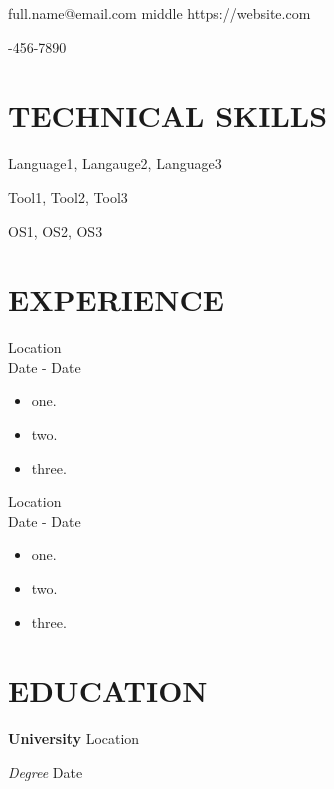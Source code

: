 \documentclass{article}
\begin{document}

\huge
{}
\normalsize

\noindent\hrulefill

\noindent 
full.name@email.com
\hfill
middle
\hfill
https://website.com

-456-7890

\section*{TECHNICAL SKILLS}

Language1, Langauge2, Language3

Tool1, Tool2, Tool3

OS1, OS2, OS3

\section*{EXPERIENCE}

 \hfill Location \\
 \hfill Date - Date
\begin{itemize}
\item one.
\item two.
\item three.
\end{itemize}

 \hfill Location \\
 \hfill Date - Date
\begin{itemize}
\item one.
\item two.
\item three.
\end{itemize}

\section*{EDUCATION}
{\bf University} \hfill Location

{\sl Degree} \hfill Date
\end{document}
